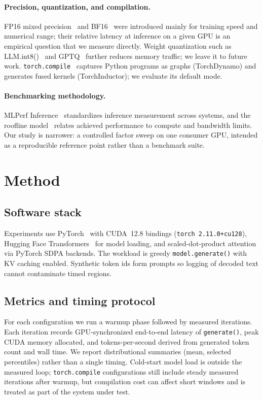 \documentclass[11pt]{article}
\begin{document}
\paragraph{Precision, quantization, and compilation.}
FP16 mixed precision~\cite{micikevicius2018mixed} and BF16~\cite{kalamkar2019bfloat16} were introduced mainly for training speed and numerical range; their relative latency at inference on a given GPU is an empirical question that we measure directly.
Weight quantization such as LLM.int8()~\cite{dettmers2022llmint8} and GPTQ~\cite{frantar2023gptq} further reduces memory traffic; we leave it to future work.
\texttt{torch.compile}~\cite{ansel2024pytorch2} captures Python programs as graphs (TorchDynamo) and generates fused kernels (TorchInductor); we evaluate its default mode.

\paragraph{Benchmarking methodology.}
MLPerf Inference~\cite{reddi2020mlperf} standardizes inference measurement across systems, and the roofline model~\cite{williams2009roofline} relates achieved performance to compute and bandwidth limits.
Our study is narrower: a controlled factor sweep on one consumer GPU, intended as a reproducible reference point rather than a benchmark suite.

\section{Method}
\subsection{Software stack}
Experiments use PyTorch~\cite{paszke2019pytorch} with CUDA~12.8 bindings (\texttt{torch 2.11.0+cu128}), Hugging Face Transformers~\cite{wolf2020transformers} for model loading, and scaled-dot-product attention via PyTorch SDPA backends.
The workload is greedy \texttt{model.generate()} with KV caching enabled.
Synthetic token ids form prompts so logging of decoded text cannot contaminate timed regions.

\subsection{Metrics and timing protocol}
For each configuration we run a warmup phase followed by measured iterations.
Each iteration records GPU-synchronized end-to-end latency of \texttt{generate()}, peak CUDA memory allocated, and tokens-per-second derived from generated token count and wall time.
We report distributional summaries (mean, selected percentiles) rather than a single timing.
Cold-start model load is outside the measured loop; \texttt{torch.compile} configurations still include steady measured iterations after warmup, but compilation cost can affect short windows and is treated as part of the system under test.
\end{document}
